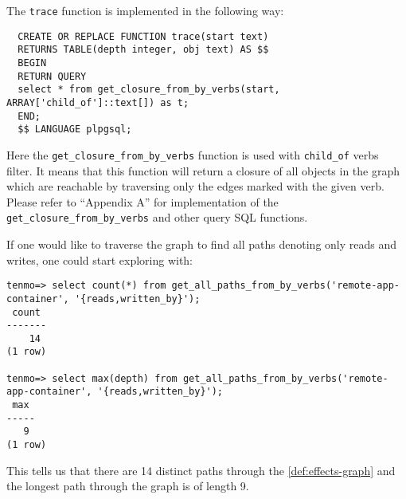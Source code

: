 The \texttt{trace} function is implemented in the following way:
%
\begin{verbatim}
  CREATE OR REPLACE FUNCTION trace(start text)
  RETURNS TABLE(depth integer, obj text) AS $$
  BEGIN
  RETURN QUERY
  select * from get_closure_from_by_verbs(start, ARRAY['child_of']::text[]) as t;
  END;
  $$ LANGUAGE plpgsql;
\end{verbatim}
%
Here the \texttt{get\_closure\_from\_by\_verbs} function is used with \texttt{child\_of} verbs filter. It means that this function will return a closure of all objects in the graph which are reachable by traversing only the edges marked with the given verb. Please refer to ``Appendix A'' for implementation of the \texttt{get\_closure\_from\_by\_verbs} and other query SQL functions.

If one would like to traverse the graph to find all paths denoting only reads and writes, one could start exploring with:
%
\begin{verbatim}
tenmo=> select count(*) from get_all_paths_from_by_verbs('remote-app-container', '{reads,written_by}');
 count 
-------
    14
(1 row)

tenmo=> select max(depth) from get_all_paths_from_by_verbs('remote-app-container', '{reads,written_by}');
 max 
-----
   9
(1 row)
\end{verbatim}
%
This tells us that there are 14 distinct paths through the \cref{def:effects-graph} and the longest path through the graph is of length 9.

